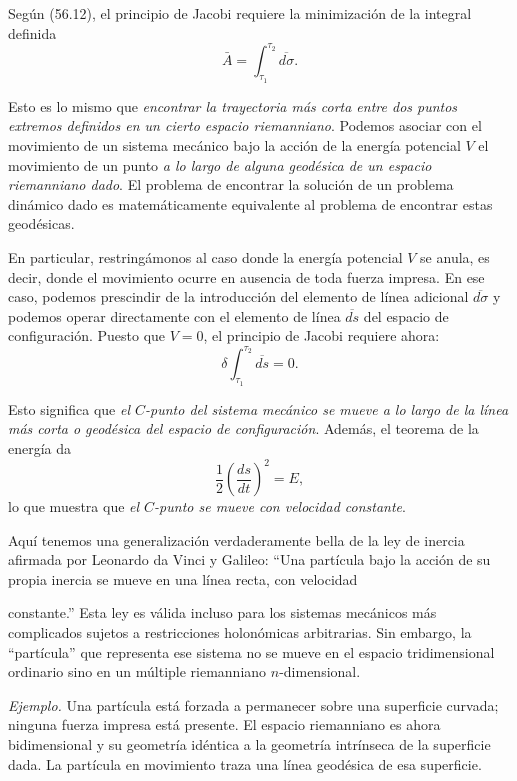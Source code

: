 \documentclass[12pt,a4paper]{book}
\begin{document}
Según (56.12), el principio de Jacobi requiere la minimización de la integral definida
\begin{equation}
\bar{A} = \int_{\tau_1}^{\tau_2} \overline{d\sigma}. \tag{57.3}
\end{equation}

Esto es lo mismo que \textit{encontrar la trayectoria más corta entre dos puntos extremos definidos en un cierto espacio riemanniano}. Podemos asociar con el movimiento de un sistema mecánico bajo la acción de la energía potencial $V$ el movimiento de un punto \textit{a lo largo de alguna geodésica de un espacio riemanniano dado}. El problema de encontrar la solución de un problema dinámico dado es matemáticamente equivalente al problema de encontrar estas geodésicas.

En particular, restringámonos al caso donde la energía potencial $V$ se anula, es decir, donde el movimiento ocurre en ausencia de toda fuerza impresa. En ese caso, podemos prescindir de la introducción del elemento de línea adicional $\overline{d\sigma}$ y podemos operar directamente con el elemento de línea $\overline{ds}$ del espacio de configuración. Puesto que $V = 0$, el principio de Jacobi requiere ahora:
\begin{equation}
\delta \int_{\tau_1}^{\tau_2} \overline{ds} = 0. \tag{57.4}
\end{equation}

Esto significa que \textit{el $C$-punto del sistema mecánico se mueve a lo largo de la línea más corta o geodésica del espacio de configuración}. Además, el teorema de la energía da
\begin{equation}
\frac{1}{2}\left(\frac{ds}{dt}\right)^2 = E, \tag{57.5}
\end{equation}
lo que muestra que \textit{el $C$-punto se mueve con velocidad constante}.

Aquí tenemos una generalización verdaderamente bella de la ley de inercia afirmada por Leonardo da Vinci y Galileo: ``Una partícula bajo la acción de su propia inercia se mueve en una línea recta, con velocidad


constante.'' Esta ley es válida incluso para los sistemas mecánicos más complicados sujetos a restricciones holonómicas arbitrarias. Sin embargo, la ``partícula'' que representa ese sistema no se mueve en el espacio tridimensional ordinario sino en un múltiple riemanniano $n$-dimensional.

\textit{Ejemplo.} Una partícula está forzada a permanecer sobre una superficie curvada; ninguna fuerza impresa está presente. El espacio riemanniano es ahora bidimensional y su geometría idéntica a la geometría intrínseca de la superficie dada. La partícula en movimiento traza una línea geodésica de esa superficie.
\end{document}
